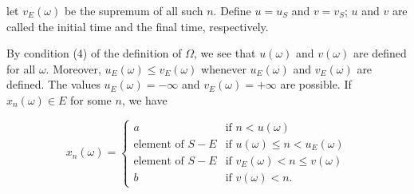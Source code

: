 let $v_E(\omega)$ be the supremum of all such $n$. Define $u = u_S$ and $v = v_S$; $u$ and $v$ are called the initial time and the final time, respectively.

By condition (4) of the definition of $\Omega$, we see that $u(\omega)$ and $v(\omega)$ are defined for all $\omega$. Moreover, $u_E(\omega) \leq v_E(\omega)$ whenever $u_E(\omega)$ and $v_E(\omega)$ are defined. The values $u_E(\omega) = -\infty$ and $v_E(\omega) = +\infty$ are possible. If $x_n(\omega) \in E$ for some $n$, we have

$$x_n(\omega) = \begin{cases} a & \text{if } n < u(\omega) \\ \text{element of } S - E & \text{if } u(\omega) \leq n < u_E(\omega) \\ \text{element of } S - E & \text{if } v_E(\omega) < n \leq v(\omega) \\ b & \text{if } v(\omega) < n. \end{cases}$$
